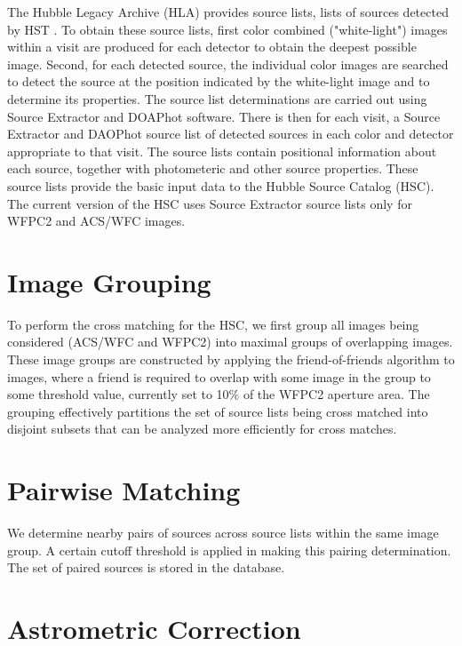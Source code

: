 The Hubble Legacy Archive (HLA) provides source lists,
lists of sources detected by HST \cite{2008ASPC..394..481W}. To obtain these source lists,
first color combined ("white-light") images within a visit are produced for
each detector to obtain the deepest possible image.
Second, for each detected source, the individual color images 
are searched to detect the source at the position indicated by the white-light image
and to determine its properties.
The source list determinations are carried out using Source Extractor
and DOAPhot software. There is then for each visit, a Source Extractor and DAOPhot source list of detected
sources in each color and detector appropriate to that visit.
 The source lists contain positional information about each
source, together with photometeric and other source properties. 
These source lists provide the basic input data to the Hubble Source Catalog (HSC).
The current version of the HSC uses Source Extractor
source lists only for WFPC2 and ACS/WFC images.

\section{Image Grouping}
To perform the cross matching for the HSC, we first group all images
being considered (ACS/WFC and WFPC2) into maximal groups of overlapping
images.  These image groups are constructed by applying the friend-of-friends
algorithm to images, where a friend is required to overlap with some image
in the group to some threshold value, currently set to 10\% of the WFPC2 aperture area.
The grouping effectively partitions the set of source lists being cross matched into
disjoint subsets that can be analyzed more efficiently for cross matches.

\section{Pairwise Matching}

We determine nearby pairs of sources across source lists within the same image group.
A certain cutoff threshold is applied in making this pairing determination.
The set of paired sources is stored in the database.

\section{Astrometric Correction}

